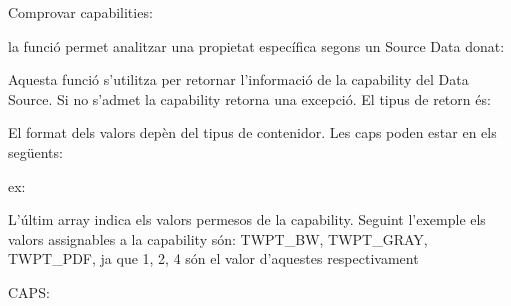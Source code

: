 \documentclass[letterpaper,11pt,catalan]{sphinxmanual}
\begin{document}
Comprovar capabilities:

la funció  permet analitzar una propietat específica segons un Source Data donat:

\begin{sphinxVerbatim}[commandchars=\\\{\}]
\end{sphinxVerbatim}

Aquesta funció s'utilitza per retornar l'informació de la capability del Data Source. Si no s'admet la capability retorna una excepció. El tipus de retorn és:

\begin{sphinxVerbatim}[commandchars=\\\{\}]
       
\end{sphinxVerbatim}

El format dels valors depèn del tipus de contenidor. Les caps poden estar en els següents:

\begin{sphinxVerbatim}[commandchars=\\\{\}]
    
\end{sphinxVerbatim}

ex:

\begin{sphinxVerbatim}[commandchars=\\\{\}]
   \PYG{p}{[}  \PYG{p}{]}
\end{sphinxVerbatim}

L'últim array indica els valors permesos de la capability. Seguint l'exemple els valors assignables a la capability són: TWPT\_BW, TWPT\_GRAY, TWPT\_PDF, ja que 1, 2, 4 són el valor
d'aquestes respectivament

CAPS:

\begin{sphinxVerbatim}[commandchars=\\\{\}]
\end{sphinxVerbatim}
\end{document}
